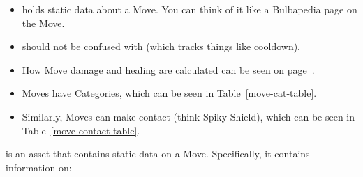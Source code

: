 

\begin{tldr}
	\begin{itemize}
		\item{ holds static data about a Move. You can think of it like a Bulbapedia page on the Move.}
		\item{ should not be confused with  (which tracks things like cooldown).}
		\item{How Move damage and healing are calculated can be seen on page~\pageref{sec:damage-calc-formula}.}
		\item{Moves have Categories, which can be seen in Table~\ref{move-cat-table}.}
		\item{Similarly, Moves can make contact (think Spiky Shield), which can be seen in Table~\ref{move-contact-table}.}
	\end{itemize}
\end{tldr}

\localtoc



 is an asset that contains static data on a Move. Specifically, it contains information on:\\

\newcommand{\bitem}[2]{\item{\textbf{#1}. #2}}

